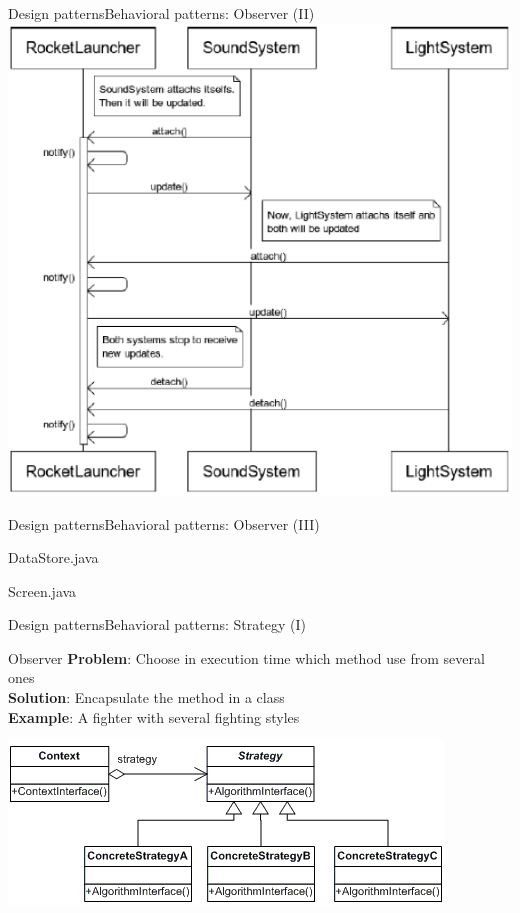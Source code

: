 \documentclass[10pt,compress]{beamer} %
\begin{document}
\begin{frame}[plain]{Design patterns}{Behavioral patterns: Observer (II)}
	\centering\includegraphics[width=0.6\linewidth]{figs/observergame}
\end{frame}

\begin{frame}{Design patterns}{Behavioral patterns: Observer (III)}
	\vspace{-0.3cm}
    \begin{block}{DataStore.java}
	    \vspace{-0.2cm}
	    
		\vspace{-0.2cm}
	\end{block}

	\vspace{-0.2cm}
    \begin{block}{Screen.java}
	    \vspace{-0.2cm}
	    
		\vspace{-0.3cm}
	\end{block}
\end{frame}

\begin{frame}{Design patterns}{Behavioral patterns: Strategy (I)}
	   \begin{block}{Observer}
			\textbf{Problem}: Choose in execution time which method use from several ones\\
			\textbf{Solution}: Encapsulate the method in a class\\
			\textbf{Example}: A fighter with several fighting styles\\
		\end{block}
		\bigskip
		\centering\includegraphics[width=0.7\linewidth]{figs/strategy}
\end{frame}
\end{document}
